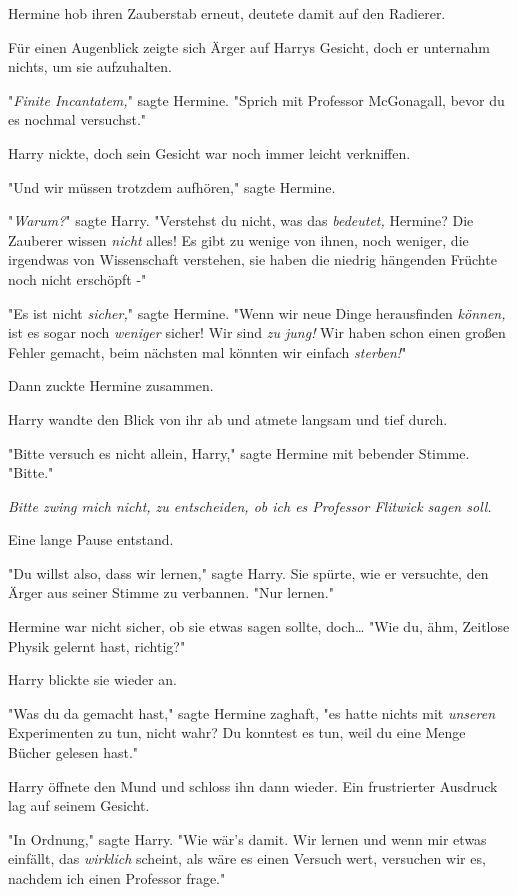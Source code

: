 {Hermine hob ihren Zauberstab erneut, deutete damit auf den Radierer.

Für einen Augenblick zeigte sich Ärger auf Harrys Gesicht, doch er unternahm nichts, um sie aufzuhalten.

"\emph{Finite Incantatem,}" sagte Hermine. "Sprich mit Professor McGonagall, bevor du es nochmal versuchst."

Harry nickte, doch sein Gesicht war noch immer leicht verkniffen.

"Und wir müssen trotzdem aufhören," sagte Hermine.

"\emph{Warum?}" sagte Harry. "Verstehst du nicht, was das \emph{bedeutet,} Hermine? Die Zauberer wissen \emph{nicht} alles! Es gibt zu wenige von ihnen, noch weniger, die irgendwas von Wissenschaft verstehen, sie haben die niedrig hängenden Früchte noch nicht erschöpft -"

"Es ist nicht \emph{sicher,}" sagte Hermine. "Wenn wir neue Dinge herausfinden \emph{können,} ist es sogar noch \emph{weniger} sicher! Wir sind \emph{zu jung!} Wir haben schon einen großen Fehler gemacht, beim nächsten mal könnten wir einfach \emph{sterben!}"

Dann zuckte Hermine zusammen.

Harry wandte den Blick von ihr ab und atmete langsam und tief durch.

"Bitte versuch es nicht allein, Harry," sagte Hermine mit bebender Stimme. "Bitte."

\emph{Bitte zwing mich nicht, zu entscheiden, ob ich es Professor Flitwick sagen soll.}

Eine lange Pause entstand.

"Du willst also, dass wir lernen," sagte Harry. Sie spürte, wie er versuchte, den Ärger aus seiner Stimme zu verbannen. "Nur lernen."

Hermine war nicht sicher, ob sie etwas sagen sollte, doch… "Wie du, ähm, Zeitlose Physik gelernt hast, richtig?"

Harry blickte sie wieder an.

"Was du da gemacht hast," sagte Hermine zaghaft, "es hatte nichts mit \emph{unseren} Experimenten zu tun, nicht wahr? Du konntest es tun, weil du eine Menge Bücher gelesen hast."

Harry öffnete den Mund und schloss ihn dann wieder. Ein frustrierter Ausdruck lag auf seinem Gesicht.

"In Ordnung," sagte Harry. "Wie wär's damit. Wir lernen und wenn mir etwas einfällt, das \emph{wirklich} scheint, als wäre es einen Versuch wert, versuchen wir es, nachdem ich einen Professor frage."

}
